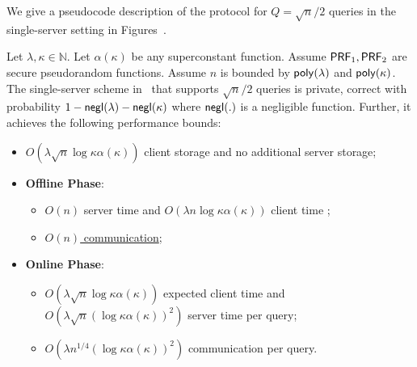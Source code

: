 We give a pseudocode description of the protocol for $Q=\sqrt{n}/2$ queries in the single-server setting in
Figures~. 




\begin{theorem}
    \label{thm:main1} Let $\lambda,\kappa\in \mathbb{N}$.
    Let $\alpha(\kappa)$ be any superconstant function. Assume $\mathsf{PRF}_1,\mathsf{PRF}_2$ are secure pseudorandom functions. Assume $n$ is bounded by $\mathsf{poly}(\lambda)$ and
    $\mathsf{poly}(\kappa)$. The single-server scheme in~ that supports
    $\sqrt{n}/2$ queries is private, correct with probability
    $1-\mathsf{negl}(\lambda)-\mathsf{negl}(\kappa)$ where $\mathsf{negl}(.)$ is a negligible function. Further, it achieves the following performance
    bounds:
    \begin{itemize}
        \item $O(\lambda\sqrt{n}\log \kappa \alpha(\kappa))$ client storage and
        no additional server storage;
        \item \textbf{Offline Phase}:
        \begin{itemize}
            \item $O(n)$ server time and $O(\lambda n\log \kappa \alpha(\kappa))$ client time
            ;
            \item \underline{$O(n)$ communication};
        \end{itemize}
        \item \textbf{Online Phase}:
        \begin{itemize}
            \item $O(\lambda\sqrt{n}\log \kappa \alpha(\kappa))$ expected client
            time and $O(\lambda\sqrt{n}(\log \kappa \alpha(\kappa))^2)$ server
            time per query; 
            \item $O(\lambda n^{1/4}(\log \kappa \alpha(\kappa))^2)$
            communication per query.
        \end{itemize}
    \end{itemize} 
\end{theorem}

